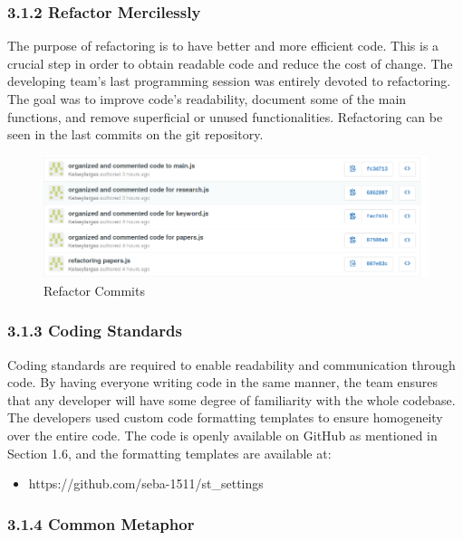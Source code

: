 \documentclass[]{article}
\begin{document}
\subsubsection{3.1.2 Refactor Mercilessly}\label{refactor-mercilessly}

The purpose of refactoring is to have better and more efficient code.
This is a crucial step in order to obtain readable code and reduce the
cost of change. The developing team's last programming session was
entirely devoted to refactoring. The goal was to improve code's
readability, document some of the main functions, and remove superficial
or unused functionalities. Refactoring can be seen in the last commits
on the git repository.

\begin{figure}[htbp]
\centering
\includegraphics{refactor_commits.png}
\caption{Refactor Commits}
\end{figure}

\subsubsection{3.1.3 Coding Standards}\label{coding-standards}

Coding standards are required to enable readability and communication
through code. By having everyone writing code in the same manner, the
team ensures that any developer will have some degree of familiarity
with the whole codebase. The developers used custom code formatting
templates to ensure homogeneity over the entire code. The code is openly
available on GitHub as mentioned in Section 1.6, and the formatting
templates are available at:

\begin{itemize}
\itemsep1pt\parskip0pt
\item
  https://github.com/seba-1511/st\_settings
\end{itemize}

\subsubsection{3.1.4 Common Metaphor}\label{common-metaphor}
\end{document}
